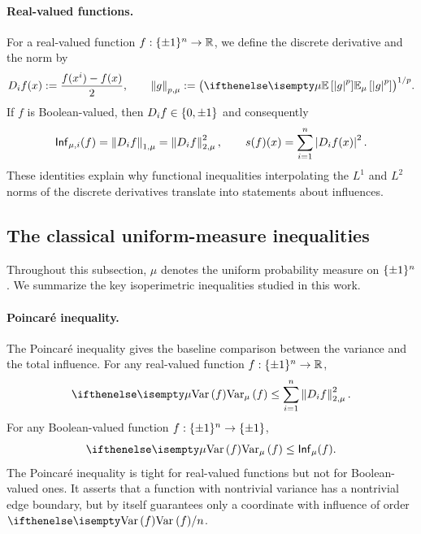 \paragraph{Real-valued functions.}
For a real-valued function $f: \{\pm 1\}^n \to \mathbb{R}$, we define the discrete derivative and the norm by
\[
    D_i f(x):= \frac{f(x^i)-f(x)}{2},
    \qquad
    \norm{g}_{p,\mu}:=\bigl(\E[\mu]{\abs{g}^p}\bigr)^{1/p}.
\]
If $f$ is Boolean-valued, then $D_i f \in\left\{0,\pm 1\right\}$ and consequently
\[
    \mathsf{Inf}_{\mu,i}(f)=\left\lVert D_i f \right\rVert_{1,\mu}=\left\lVert D_i f \right\rVert_{2,\mu}^2,
    \qquad
    s(f)(x)=\sum_{i=1}^n \left\vert D_i f(x)\right\vert^2.
\]
These identities explain why functional inequalities interpolating the $L^1$ and $L^2$ norms of the discrete derivatives translate into statements about influences.

\subsection{The classical uniform-measure inequalities}

Throughout this subsection, $\mu$ denotes the uniform probability measure on $\{\pm 1\}^n$. We summarize the key isoperimetric inequalities studied in this work.

\paragraph{Poincaré inequality.} The Poincaré inequality gives the baseline comparison between the variance and the total influence. 
For any real-valued function $f: \{\pm 1\}^n \to \mathbb{R}$,
\begin{equation}\label{eq:poincare-R}
    \Var[\mu]{f}
    \leq \sum_{i=1}^n \norm{D_i f}_{2,\mu}^2.
\end{equation}
For any Boolean-valued function $f: \{\pm 1\}^n \to \{\pm 1\}$,
\begin{equation}\label{eq:poincare-B}
    \Var[\mu]{f}
    \leq \Inf_\mu(f).
\end{equation}
The Poincaré inequality is tight for real-valued functions but not for Boolean-valued ones.
It asserts that a function with nontrivial variance has a nontrivial edge boundary, but by itself guarantees only a coordinate with influence of order $\Var{f}/n$.

